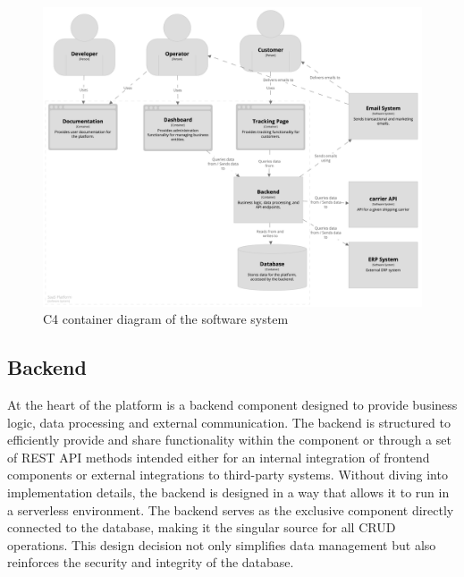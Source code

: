 \begin{figure}[H]\centering
\includegraphics[width=140mm]{img/chap03/fig_architecture.png}
\caption{C4 container diagram of the software system}
\label{img03:c4_container_diagram_software_sytem}
\end{figure}

\subsection{Backend}
\label{subsec:backend}
At the heart of the platform is a backend component designed to provide business logic, data processing and external communication.
The backend is structured to efficiently provide and share functionality within the component or through a set of REST API methods intended either for an internal integration of frontend components or external integrations to third-party systems.
Without diving into implementation details, the backend is designed in a way that allows it to run in a serverless environment.
The backend serves as the exclusive component directly connected to the database, making it the singular source for all \ac{CRUD} operations.
This design decision not only simplifies data management but also reinforces the security and integrity of the database.

